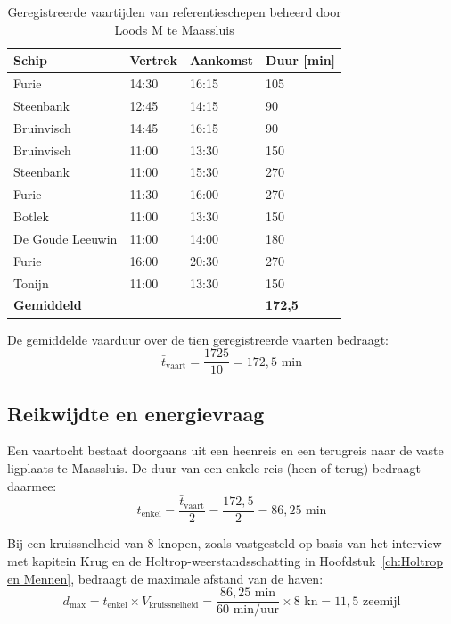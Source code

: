 \begin{table}[H]
    \centering
    \caption{Geregistreerde vaartijden van referentieschepen beheerd door Loods M te Maassluis}
    \label{tab:vaartijden}
    \begin{tabular}{llll}
        \toprule
        \textbf{Schip} & \textbf{Vertrek} & \textbf{Aankomst} & \textbf{Duur [min]} \\
        \midrule
        Furie           & 14:30 & 16:15 & 105 \\
        Steenbank       & 12:45 & 14:15 & 90 \\
        Bruinvisch      & 14:45 & 16:15 & 90 \\
        Bruinvisch      & 11:00 & 13:30 & 150 \\
        Steenbank       & 11:00 & 15:30 & 270 \\
        Furie           & 11:30 & 16:00 & 270 \\
        Botlek          & 11:00 & 13:30 & 150 \\
        De Goude Leeuwin& 11:00 & 14:00 & 180 \\
        Furie           & 16:00 & 20:30 & 270 \\
        Tonijn          & 11:00 & 13:30 & 150 \\
        \midrule
        \textbf{Gemiddeld} & & & \textbf{172{,}5} \\
        \bottomrule
    \end{tabular}
\end{table}

De gemiddelde vaarduur over de tien geregistreerde vaarten bedraagt:
\begin{equation}
    \bar{t}_\text{vaart} = \frac{1725}{10} = 172{,}5 \text{ min}
    \label{eq:gemvaarduur}
\end{equation}

\subsection{Reikwijdte en energievraag}
Een vaartocht bestaat doorgaans uit een heenreis en een terugreis naar de vaste ligplaats 
te Maassluis. De duur van een enkele reis (heen of terug) bedraagt daarmee:
\begin{equation}
    t_\text{enkel} = \frac{\bar{t}_\text{vaart}}{2} = \frac{172{,}5}{2} = 86{,}25 \text{ min}
    \label{eq:enkelereis}
\end{equation}

Bij een kruissnelheid van 8 knopen, zoals vastgesteld op basis van het interview met 
kapitein Krug en de Holtrop-weerstandsschatting in Hoofdstuk~\ref{ch:Holtrop en Mennen}, bedraagt 
de maximale afstand van de haven:
\begin{equation}
    d_\text{max} = t_\text{enkel} \times V_\text{kruissnelheid} 
    = \frac{86{,}25 \text{ min}}{60 \text{ min/uur}} \times 8 \text{ kn} = 11{,}5 \text{ zeemijl}
    \label{eq:bereik}
\end{equation}

